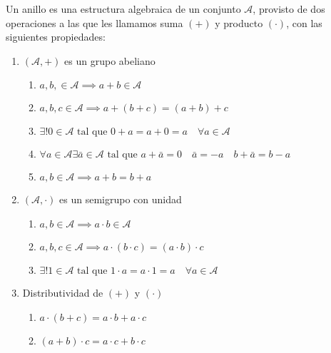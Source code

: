         \begin{definicion}
            Un anillo es una estructura algebraica de un conjunto $\mathcal{A}$, provisto de dos operaciones a las que les llamamos suma $(+)$ y producto $(\cdot)$, con las siguientes propiedades:

            \begin{enumerate}
                \item $(\mathcal{A}, +)$ es un grupo abeliano

                \begin{enumerate}
                    \item $a, b, \in \mathcal{A} \implies a + b \in \mathcal{A}$
                    \item $a, b, c \in \mathcal{A} \implies a + (b + c) = (a + b) + c$
                    \item $\exists ! 0 \in \mathcal{A} \text{ tal que } 0 + a = a + 0 = a \quad \forall a \in \mathcal{A}$
                    \item $\forall a \in \mathcal{A} \exists \bar{a} \in \mathcal{A} \text{ tal que } a + \bar{a} = 0 \quad \bar{a} = -a \quad b + \bar{a} = b - a$
                    \item $a, b \in \mathcal{A} \implies a + b = b + a$
                \end{enumerate}

                \item $(\mathcal{A}, \cdot)$ es un semigrupo con unidad

                \begin{enumerate}
                    \item $a, b \in \mathcal{A} \implies a \cdot b \in \mathcal{A}$
                    \item $a, b, c \in \mathcal{A} \implies a \cdot (b \cdot c) = (a \cdot b) \cdot c$
                    \item $\exists ! 1 \in \mathcal{A} \text{ tal que } 1 \cdot a  = a \cdot 1 = a \quad \forall a \in \mathcal{A}$
                \end{enumerate}

                \item Distributividad de $(+)$ y $(\cdot)$

                \begin{enumerate}
                    \item $a \cdot (b + c) = a \cdot b + a \cdot c$
                    \item $(a + b) \cdot c = a \cdot c + b \cdot c$
                \end{enumerate}


\end{enumerate}
\end{definicion}
